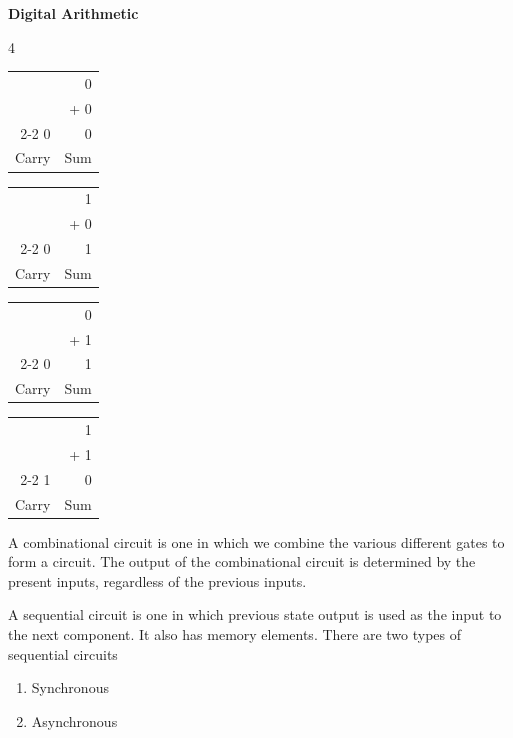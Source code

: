 \begin{center}
   \textbf{\LARGE{Digital Arithmetic}}
   \vspace{6ex}
\end{center}

\begin{multicols}{4}
   \renewcommand{\arraystretch}{1}
   \begin{tabular}{rr}
      & 0\\
      & + 0\\\cline{2-2}
      0 & 0\\
      Carry & Sum
   \end{tabular}

   \begin{tabular}{rr}
      & 1\\
      & + 0\\\cline{2-2}
      0 & 1\\
      Carry & Sum
   \end{tabular}

   \begin{tabular}{rr}
      & 0\\
      & + 1\\\cline{2-2}
      0 & 1\\
      Carry & Sum
   \end{tabular}

   \begin{tabular}{rr}
      & 1\\
      & + 1\\\cline{2-2}
      1 & 0\\
      Carry & Sum
   \end{tabular}
\end{multicols}

A combinational circuit is one in which we combine the various different gates to form a circuit. The output of the combinational circuit is determined by the present inputs, regardless of the previous inputs.

A sequential circuit is one in which previous state output is used as the input to the next component. It also has memory elements.
There are two types of sequential circuits

\vspace{-1ex}
\begin{enumerate}[label=(\alph*), labelsep=0.25cm, align=right, left=0pt]
   \item Synchronous
   \item Asynchronous
\end{enumerate}


